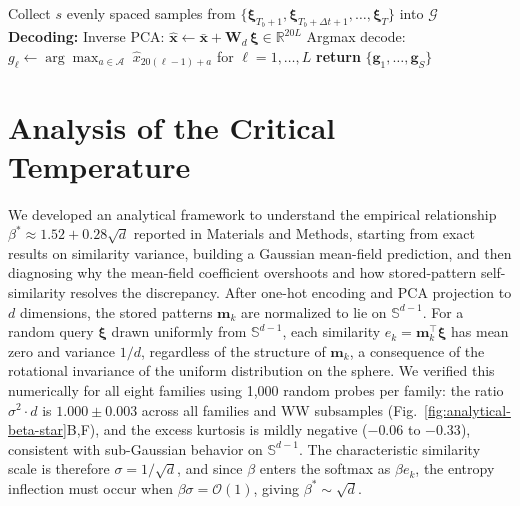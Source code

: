 \documentclass[10pt]{article}
\begin{document}
\begin{algorithm}[ht]
\begin{algorithmic}[1]
    \ENDFOR
    \STATE Collect $s$ evenly spaced samples from $\{\boldsymbol{\xi}_{T_b+1}, \boldsymbol{\xi}_{T_b+\Delta t+1}, \ldots, \boldsymbol{\xi}_T\}$ into $\mathcal{G}$
\ENDFOR
\STATE \textbf{Decoding:}
    \STATE Inverse PCA: $\hat{\mathbf{x}} \leftarrow \bar{\mathbf{x}} + \mathbf{W}_d\,\boldsymbol{\xi} \in \mathbb{R}^{20L}$
    \STATE Argmax decode: $g_\ell \leftarrow \arg\max_{a \in \mathcal{A}}\; \hat{x}_{20(\ell-1)+a}$ \; for $\ell = 1,\ldots,L$
\ENDFOR
\STATE \textbf{return} $\{\mathbf{g}_1, \ldots, \mathbf{g}_S\}$
\end{algorithmic}
\end{algorithm}

\section{Analysis of the Critical Temperature}\label{si:beta-star-theory}

We developed an analytical framework to understand the empirical relationship $\beta^* \approx 1.52 + 0.28\sqrt{d}$ reported in Materials and Methods, starting from exact results on similarity variance, building a Gaussian mean-field prediction, and then diagnosing why the mean-field coefficient overshoots and how stored-pattern self-similarity resolves the discrepancy. After one-hot encoding and PCA projection to $d$ dimensions, the stored patterns $\mathbf{m}_k$ are normalized to lie on $\mathbb{S}^{d-1}$. For a random query $\boldsymbol{\xi}$ drawn uniformly from $\mathbb{S}^{d-1}$, each similarity $e_k = \mathbf{m}_k^\top\boldsymbol{\xi}$ has mean zero and variance $1/d$, regardless of the structure of $\mathbf{m}_k$, a consequence of the rotational invariance of the uniform distribution on the sphere. We verified this numerically for all eight families using 1{,}000 random probes per family: the ratio $\sigma^2 \cdot d$ is $1.000 \pm 0.003$ across all families and WW subsamples (Fig.~\ref{fig:analytical-beta-star}B,F), and the excess kurtosis is mildly negative ($-0.06$ to $-0.33$), consistent with sub-Gaussian behavior on $\mathbb{S}^{d-1}$. The characteristic similarity scale is therefore $\sigma = 1/\sqrt{d}$, and since $\beta$ enters the softmax as $\beta e_k$, the entropy inflection must occur when $\beta\sigma = \mathcal{O}(1)$, giving $\beta^* \sim \sqrt{d}$.
\end{document}
